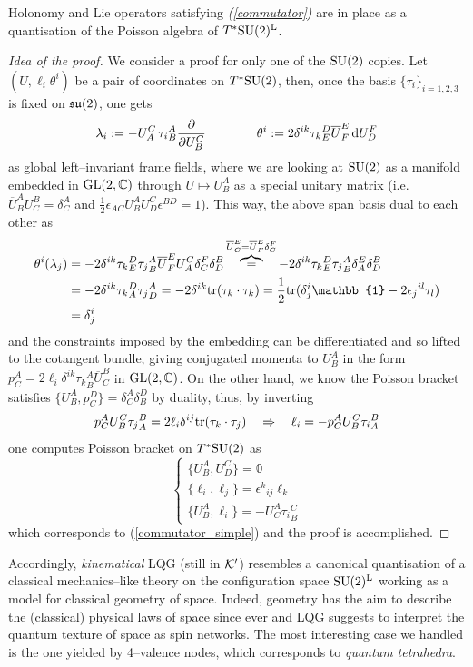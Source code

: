 \begin{teo}
    Holonomy and Lie operators satisfying \emph{(\ref{commutator})} are in place as a quantisation of the Poisson algebra of $T^*\SU(2)^\Latt$.
\end{teo}
\begin{proof}[Idea of the proof]
    We consider a proof for only one of the $\SU(2)$ copies. Let $(U,\ell_i\theta^i)$ be a pair of coordinates on $T^*\SU(2)$, then, once the basis $\{\tau_i\}_{i=1,2,3}$ is fixed on $\su(2)$, one gets 
$$\lambda_i:=-U^C_A\,{\tau_i}^A_B\frac{\der}{\der U^C_B}\qquad\qquad\theta^i:=2\delta^{ik}{\tau_k}^D_E\overline{U}^E_F\,\d U^F_D$$
as global left--invariant frame fields, where we are looking at $\SU(2)$ as a manifold embedded in $\GL(2,\C)$ through $U\mapsto U^A_B$ as a special unitary matrix (i.e. $\overline{U}^A_BU^B_C=\delta^A_C$ and $\frac{1}{2}\epsilon_{AC}U^A_BU^C_D\epsilon^{BD}=1$). This way, the above span basis dual to each other as
\begin{align*}
    \theta^i(\lambda_j)&=-2\delta^{ik}{\tau_k}^D_E{\tau_j}^A_B\overline{U}^E_FU^C_A\delta^F_C\delta^B_D\overbrace{=}^{\overline{U}^E_C=\overline{U}^E_F\delta^F_C}-2\delta^{ik}{\tau_k}^D_E{\tau_j}^A_B\delta^E_A\delta^B_D\\
    &=-2\delta^{ik}{\tau_k}^D_A{\tau_j}^A_D=-2\delta^{ik}\tr(\tau_k\cdot\tau_k)=\frac{1}{2}\tr(\delta^i_j\mathbb{1}-2{\epsilon_j}^{il}\tau_l)\\
    &=\delta^i_j
\end{align*}
and the constraints imposed by the embedding
 can be differentiated and so lifted to the cotangent bundle, giving conjugated momenta to $U^A_B$ in the form $p^A_C=2\ell_i\delta^{ik}{\tau_k}^A_B\overline{U}^B_C$ in $\GL(2,\C)$. On the other hand, we know the Poisson bracket satisfies $\{U^A_B,p_C^D\}=\delta^A_C\delta_B^D$ by duality, thus, by inverting 
 $$p^A_CU^C_B{\tau_j}^B_A=2\ell_i\delta^{ij}\tr(\tau_k\cdot\tau_j)\quad\Rightarrow\quad \ell_i=-p^A_CU^C_B{\tau_i}^B_A$$
one computes Poisson bracket on $T^*\SU(2)$ as
$$\begin{cases}
    \{U^A_B,U^C_D\}=\mathbb{0}\\
    
    \{\ell_i,\ell_j\}={\epsilon^k}_{ij}\ell_k\\
    \{U^A_B,\ell_i\}=-U^A_C{\tau_i}^C_B
\end{cases}$$
which corresponds to (\ref{commutator_simple}) and the proof is accomplished.
\end{proof}
{Accordingly, \emph{kinematical }LQG (still in $\Kk'$) resembles a canonical quantisation of a classical mechanics--like theory on the configuration space $\SU(2)^\Latt$ working as a model for classical geometry of space. Indeed, geometry has the aim to describe the (classical) physical laws of space since ever and LQG suggests to interpret the quantum texture of space as spin networks. The most interesting case we handled is the one yielded by 4--valence nodes, which corresponds to \emph{quantum tetrahedra}.}

